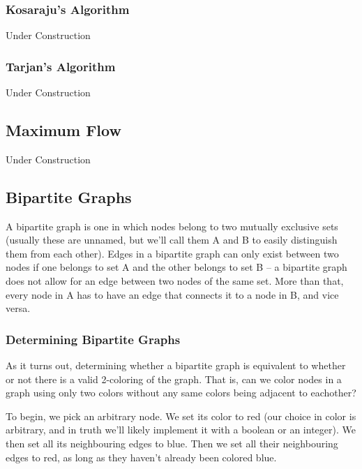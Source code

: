 \subsubsection{Kosaraju's Algorithm}

Under Construction

\subsubsection{Tarjan's Algorithm}

Under Construction

\subsection{Maximum Flow}

Under Construction

\subsection{Bipartite Graphs}

A bipartite graph is one in which nodes belong to two mutually exclusive sets (usually these are unnamed, but we'll call them A and B to easily distinguish them from each other). Edges in a bipartite graph can only exist between two nodes if one belongs to set A and the other belongs to set B -- a bipartite graph does not allow for an edge between two nodes of the same set. More than that, every node in A has to have an edge that connects it to a node in B, and vice versa.

\subsubsection{Determining Bipartite Graphs}

As it turns out, determining whether a bipartite graph is equivalent to whether or not there is a valid 2-coloring of the graph. That is, can we color nodes in a graph using only two colors without any same colors being adjacent to eachother?

To begin, we pick an arbitrary node. We set its color to red (our choice in color is arbitrary, and in truth we'll likely implement it with a boolean or an integer). We then set all its neighbouring edges to blue. Then we set all their neighbouring edges to red, as long as they haven't already been colored blue.

